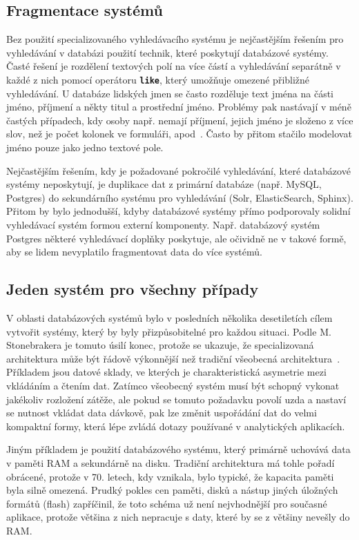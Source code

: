 \documentclass[11pt,letterpaper,oneside,openright]{book}
\newcommand{\bftt}[1]{\texttt{\textbf{#1}}}
\begin{document}
\subsection{Fragmentace systémů}
Bez použití specializovaného vyhledávacího systému je nejčastějším řešením pro
vyhledávání v databázi použití technik, které poskytují databázové systémy.
Časté řešení je rozdělení textových polí na více částí a vyhledávání separátně
v každé z nich pomocí operátoru \bftt{like}, který umožňuje omezené přibližné
vyhledávání. U databáze lidských jmen se často rozděluje text jména na části
jméno, příjmení a někty titul a prostřední jméno. Problémy pak nastávají v méně
častých případech, kdy osoby např. nemají příjmení, jejich jméno je složeno z
více slov, než je počet kolonek ve formuláři, apod~\cite{name_falsehoods}.
Často by přitom stačilo modelovat jméno pouze jako jedno textové pole.

Nejčastějším řešením, kdy je požadované pokročilé vyhledávání, které databázové
systémy neposkytují, je duplikace dat z primární databáze (např. MySQL,
Postgres) do sekundárního systému pro vyhledávání (Solr, ElasticSearch,
Sphinx). Přitom by bylo jednodušší, kdyby databázové systémy přímo podporovaly
solidní vyhledávací systém formou externí komponenty. Např. databázový systém
Postgres některé vyhledávací doplňky poskytuje, ale očividně ne v takové formě,
aby se lidem nevyplatilo fragmentovat data do více systémů.


\subsection{Jeden systém pro všechny případy}
V oblasti databázových systémů bylo v posledních několika desetiletích cílem
vytvořit systémy, který by byly přizpůsobitelné pro každou situaci. Podle M.
Stonebrakera je tomuto úsilí konec, protože se ukazuje, že specializovaná
architektura může být řádově výkonnější než tradiční všeobecná
architektura~\cite{Stonebraker:2005:OSF:1053724.1054024}. Příkladem jsou datové
sklady, ve kterých je charakteristická asymetrie mezi vkládáním a čtením dat.
Zatímco všeobecný systém musí být schopný vykonat jakékoliv rozložení zátěže,
ale pokud se tomuto požadavku povolí uzda a nastaví se nutnost vkládat data
dávkově, pak lze změnit uspořádání dat do velmi kompaktní formy, která lépe
zvládá dotazy používané v analytických aplikacích.

Jiným příkladem je použití databázového systému, který primárně uchovává data v
paměti RAM a sekundárně na disku. Tradiční architektura má tohle pořadí
obrácené, protože v 70. letech, kdy vznikala, bylo typické, že kapacita paměti
byla silně omezená. Prudký pokles cen paměti, disků a nástup jiných úložných
formátů (flash) zapříčinil, že toto schéma už není nejvhodnější pro současné
aplikace, protože většina z nich nepracuje s daty, které by se z většiny
nevešly do RAM.
\end{document}
